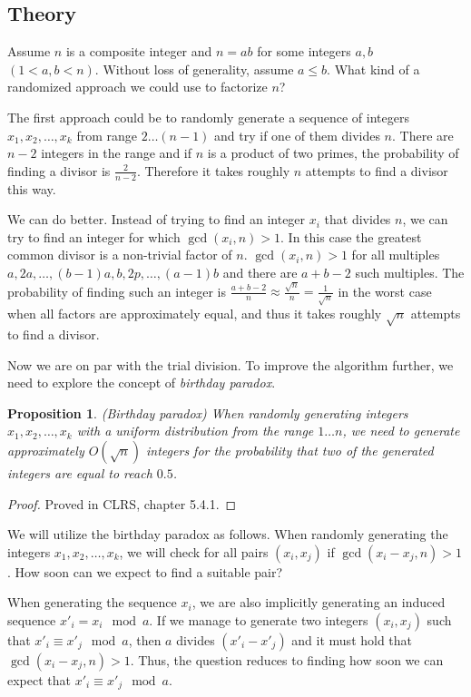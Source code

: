 \documentclass[12pt] {article}
\theoremstyle{plain}
\newtheorem{prop}[thm]{Proposition}
\theoremstyle{definition}
\begin{document}
\subsection {Theory}

Assume $n$ is a composite integer and $n = ab$ for some integers $a, b$ $(1 < a, b < n)$. Without loss of generality, assume $a \leq b$. What kind of a randomized approach we could use to factorize $n$?

The first approach could be to randomly generate a sequence of integers $x_1, x_2, \dots, x_k$ from range $2 \dots (n-1)$ and try if one of them divides $n$. There are $n-2$ integers in the range and if $n$ is a product of two primes, the probability of finding a divisor is $\frac{2}{n-2}$. Therefore it takes roughly $n$ attempts to find a divisor this way.

We can do better. Instead of trying to find an integer $x_i$ that divides $n$, we can try to find an integer for which $\gcd(x_i, n) > 1$. In this case the greatest common divisor is a non-trivial factor of $n$. $\gcd(x_i, n) > 1$ for all multiples $a, 2a, \dots, (b-1)a, b, 2p, \dots, (a-1)b$ and there are $a + b - 2$ such multiples. The probability of finding such an integer is $\frac{a+b-2}{n} \approx \frac{\sqrt{n}}{n} = \frac{1}{\sqrt{n}}$ in the worst case when all factors are approximately equal, and thus it takes roughly $\sqrt{n}$ attempts to find a divisor.

Now we are on par with the trial division. To improve the algorithm further, we need to explore the concept of \textit{birthday paradox}.

\begin{prop} (Birthday paradox)
\label {prop:birthdayparadox}
When randomly generating integers $x_1, x_2, \dots, x_k$ with a uniform distribution from the range $1 \dots n$, we need to generate approximately $O(\sqrt{n})$ integers for the probability that two of the generated integers are equal to reach $0.5$.
\end{prop}

\begin{proof}
Proved in CLRS\cite{clrs}, chapter 5.4.1.
\end{proof}

We will utilize the birthday paradox as follows. When randomly generating the integers $x_1, x_2, \dots, x_k$, we will check for all pairs $(x_i, x_j)$ if $\gcd(x_i - x_j, n) > 1$. How soon can we expect to find a suitable pair?

When generating the sequence $x_i$, we are also implicitly generating an induced sequence $x'_i = x_i \mod a$. If we manage to generate two integers $(x_i, x_j)$ such that $x'_i \equiv x'_j \mod a$, then $a$ divides $(x'_i-x'_j)$ and it must hold that $\gcd(x_i-x_j, n) > 1$. Thus, the question reduces to finding how soon we can expect that $x'_i \equiv x'_j \mod a$.
\end{document}
